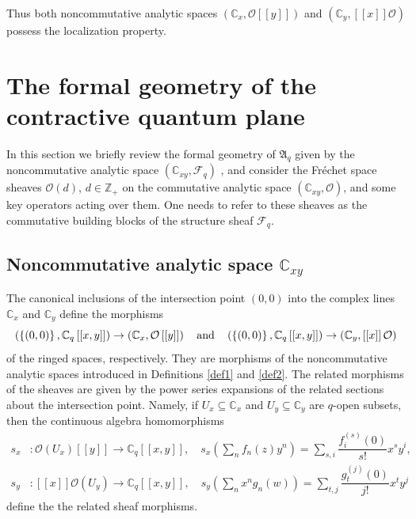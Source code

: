 \documentclass[12pt,reqno]{amsart}%
\theoremstyle{plain}
\numberwithin{theorem}{section} \numberwithin{equation}{section}
\numberwithin{lemma}{section}
\numberwithin{remark}{section}
\numberwithin{example}{section}
\numberwithin{proposition}{section}
\numberwithin{definition}{section}
\numberwithin{corollary}{section}
\begin{document}
Thus both noncommutative analytic spaces $\left(  \mathbb{C}_{x}%
,\mathcal{O}\left[  \left[  y\right]  \right]  \right)  $ and $\left(
\mathbb{C}_{y},\left[  \left[  x\right]  \right]  \mathcal{O}\right)  $
possess the localization property.

\section{The formal geometry of the contractive quantum plane}

In this section we briefly review the formal geometry of $\mathfrak{A}_{q}$
given by the noncommutative analytic space $\left(  \mathbb{C}_{xy}%
,\mathcal{F}_{q}\right)  $ \cite{Dosi25}, and consider the Fr\'{e}chet space
sheaves $\mathcal{O}\left(  d\right)  $, $d\in\mathbb{Z}_{+}$ on the
commutative analytic space $\left(  \mathbb{C}_{xy},\mathcal{O}\right)  $, and
some key operators acting over them. One needs to refer to these sheaves as
the commutative building blocks of the structure sheaf $\mathcal{F}_{q}$.

\subsection{Noncommutative analytic space $\mathbb{C}_{xy}$\label{subsecNCCP}}

The canonical inclusions of the intersection point $\left(  0,0\right)  $ into
the complex lines $\mathbb{C}_{x}$ and $\mathbb{C}_{y}$ define the morphisms%
\[
\left(  \left\{  \left(  0,0\right)  \right\}  ,\mathbb{C}_{q}\left[  \left[
x,y\right]  \right]  \right)  \rightarrow\left(  \mathbb{C}_{x},\mathcal{O}%
\left[  \left[  y\right]  \right]  \right)  \text{\quad and\quad}\left(
\left\{  \left(  0,0\right)  \right\}  ,\mathbb{C}_{q}\left[  \left[
x,y\right]  \right]  \right)  \rightarrow\left(  \mathbb{C}_{y},\left[
\left[  x\right]  \right]  \mathcal{O}\right)
\]
of the ringed spaces, respectively. They are morphisms of the noncommutative
analytic spaces introduced in Definitions \ref{def1} and \ref{def2}. The
related morphisms of the sheaves are given by the power series expansions of
the related sections about the intersection point. Namely, if $U_{x}%
\subseteq\mathbb{C}_{x}$ and $U_{y}\subseteq\mathbb{C}_{y}$ are $q$-open
subsets, then the continuous algebra homomorphisms
\begin{align*}
s_{x}  &  :\mathcal{O}\left(  U_{x}\right)  \left[  \left[  y\right]  \right]
\rightarrow\mathbb{C}_{q}\left[  \left[  x,y\right]  \right]  ,\quad
s_{x}\left(  \sum_{n}f_{n}\left(  z\right)  y^{n}\right)  =\sum_{s,i}%
\dfrac{f_{i}^{\left(  s\right)  }\left(  0\right)  }{s!}x^{s}y^{i},\\
s_{y}  &  :\left[  \left[  x\right]  \right]  \mathcal{O}\left(  U_{y}\right)
\rightarrow\mathbb{C}_{q}\left[  \left[  x,y\right]  \right]  ,\quad
s_{y}\left(  \sum_{n}x^{n}g_{n}\left(  w\right)  \right)  =\sum_{t,j}%
\dfrac{g_{t}^{\left(  j\right)  }\left(  0\right)  }{j!}x^{t}y^{j}%
\end{align*}
define the the related sheaf morphisms.
\end{document}
